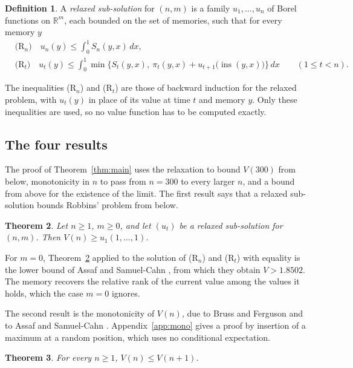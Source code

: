 \documentclass[11pt]{amsart}
\newtheorem{theorem}{Theorem}[section]
\theoremstyle{definition}
\newtheorem{definition}[theorem]{Definition}
\numberwithin{equation}{section}
\newcommand{\lean}[1]{\ignorespaces}
\newcommand{\R}{\mathbb{R}}
\newcommand{\ins}{\operatorname{ins}}
\begin{document}
\begin{definition}\label{def:relaxed}\lean{Robbins.RelaxedSubSolution}
A \emph{relaxed sub-solution} for $(n,m)$ is a family $u_1,\dots,u_n$ of Borel functions on $\R^m$, each bounded on the set of memories, such that for every memory $y$
\begin{align*}
&\text{(R$_n$)}\quad u_n(y)\le\int_0^1 S_n(y,x)\,dx,\\
&\text{(R$_t$)}\quad u_t(y)\le\int_0^1\min\bigl\{S_t(y,x),\ \pi_t(y,x)+u_{t+1}\bigl(\ins(y,x)\bigr)\bigr\}\,dx\qquad(1\le t<n).
\end{align*}
\end{definition}

The inequalities (R$_n$) and (R$_t$) are those of backward induction for the relaxed problem, with $u_t(y)$ in place of its value at time $t$ and memory $y$. Only these inequalities are used, so no value function has to be computed exactly.

\subsection{The four results}
The proof of Theorem~\ref{thm:main} uses the relaxation to bound $V(300)$ from below, monotonicity in $n$ to pass from $n=300$ to every larger $n$, and a bound from above for the existence of the limit. The first result says that a relaxed sub-solution bounds Robbins' problem from below.

\begin{theorem}\label{thm:relax}\lean{Robbins.RelaxedSubSolution.val_one_le_v, Robbins.le_v_of_verification, Robbins.card_lt_add_ite, Robbins.card_traj}
Let $n\ge1$, $m\ge0$, and let $(u_t)$ be a relaxed sub-solution for $(n,m)$. Then $V(n)\ge u_1(1,\dots,1)$.
\end{theorem}

For $m=0$, Theorem~\ref{thm:relax} applied to the solution of (R$_n$) and (R$_t$) with equality is the lower bound of Assaf and Samuel-Cahn \cite[(3.3) and Theorem~3.3]{AS96}, from which they obtain $V>1.8502$. The memory recovers the relative rank of the current value among the values it holds, which the case $m=0$ ignores.

The second result is the monotonicity of $V(n)$, due to Bruss and Ferguson \cite[Theorem~2]{BF93} and to Assaf and Samuel-Cahn \cite[Theorem~3.1]{AS96}. Appendix~\ref{app:mono} gives a proof by insertion of a maximum at a random position, which uses no conditional expectation.

\begin{theorem}\label{thm:mono}\lean{Robbins.v_mono, Robbins.Rule.v_le_expectedRank}
For every $n\ge1$, $V(n)\le V(n+1)$.
\end{theorem}
\end{document}
